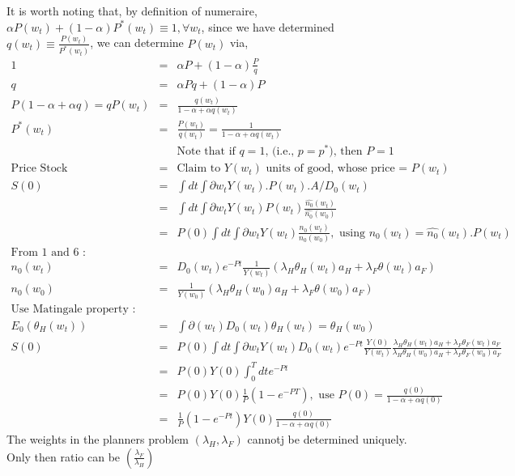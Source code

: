 \documentclass[]{article}
\begin{document}
It is worth noting that, by definition of numeraire, $\alpha P(w_t) + (1-\alpha) P^*(w_t) \equiv 1, \forall w_t$, since we have determined $q(w_t) \equiv \frac{P(w_t)}{P^*(w_t)}$, we can determine $P(w_t)$ via, 
\begin{eqnarray*}
1 &=& \alpha P + (1-\alpha) \frac{P}{q}\\
q &=& \alpha Pq + (1-\alpha) P\\
P(1-\alpha + \alpha q) = q
P(w_t) &=& \frac{q(w_t)}{1-\alpha + \alpha q(w_t)}\\
P^*(w_t) &=& \frac{P(w_t)}{q(w_t)} = \frac{1}{1-\alpha + \alpha q (w_t)}\\
&& \mbox{Note that if $q=1$, (i.e., $p=p^*$), then $P=1$}\\
\mbox{Price Stock} &=& \mbox{Claim to $Y(w_t)$ units of good, whose price = $P(w_t)$}\\
S(0) &=& \int dt \int \partial w_t Y(w_t).P(w_t).A/D_0(w_t)\\
&=& \int dt \int \partial w_t Y(w_t) P(w_t) \frac{\hat{n_0}(w_t)}{\hat{n_0}(w_0)}\\
&=& P(0) \int dt \int \partial w_t Y(w_t) \frac{n_0(w_t)}{n_0 (w_0)}, \mbox{ using } n_0(w_t) = \hat{n_0}(w_t).P(w_t)\\
\mbox{From 1 and 6 : } &&\\
n_0(w_t) &=& D_0(w_t) e^{-Pt} \frac{1}{Y(w_t)} (\lambda_H \theta_H(w_t) a_H + \lambda_F \theta (w_t) a_F)\\
n_0(w_0) &=& \frac{1}{Y(w_0)} (\lambda_H \theta_H(w_0) a_H + \lambda_F \theta (w_0) a_F)\\
\mbox{Use Matingale property :}&&\\
E_0(\theta_H(w_t)) &=& \int \partial (w_t)D_0(w_t) \theta_H(w_t) = \theta_H(w_0)\\
S(0) &=& P(0) \int dt \int \partial w_t Y(w_t) D_0 (w_t) e^{-Pt} \frac{Y(0)}{Y(w_t)} \frac{\lambda_H \theta_H (w_t)a_H + \lambda_F \theta_F(w_t) a_F}{\lambda_H \theta_H (w_0) a_H + \lambda_F \theta_F (w_0) a_F}\\
&=& P(0) Y(0) \int_0^T dt e^{-Pt}\\
&=& P(0) Y(0) \frac{1}{P} (1-e^{-PT}), \mbox{ use } P(0) = \frac{q(0)}{1-\alpha + \alpha q(0)} \\
&=& \frac{1}{P} (1-e^{-Pt}) Y(0) \frac{q(0)}{1-\alpha + \alpha q(0)}
\end{eqnarray*}
The weights in the planners problem $(\lambda_H, \lambda_F)$ cannotj be determined uniquely. Only then ratio can be $(\frac{\lambda_F}{\lambda_H})$
\end{document}
